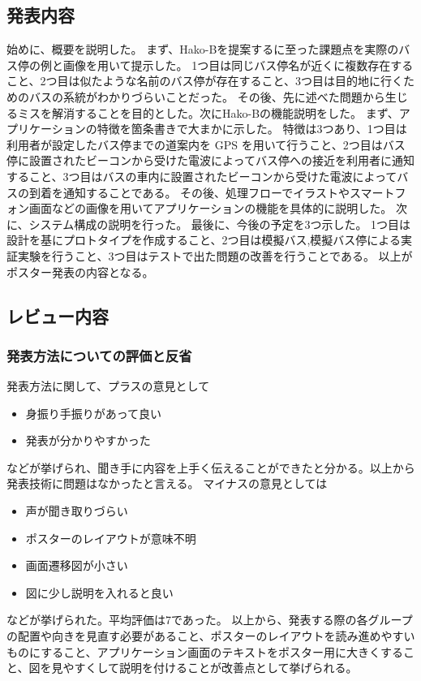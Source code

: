 \documentclass[openany,11pt,papersize]{jsbook}
\begin{document}

\subsection{発表内容}
始めに、概要を説明した。
まず、Hako-Bを提案するに至った課題点を実際のバス停の例と画像を用いて提示した。
1つ目は同じバス停名が近くに複数存在すること、2つ目は似たような名前のバス停が存在すること、3つ目は目的地に行くためのバスの系統がわかりづらいことだった。
その後、先に述べた問題から生じるミスを解消することを目的とした。次にHako-Bの機能説明をした。
まず、アプリケーションの特徴を箇条書きで大まかに示した。
特徴は3つあり、1つ目は利用者が設定したバス停までの道案内を GPS を用いて行うこと、2つ目はバス停に設置されたビーコンから受けた電波によってバス停への接近を利用者に通知すること、3つ目はバスの車内に設置されたビーコンから受けた電波によってバスの到着を通知することである。
その後、処理フローでイラストやスマートフォン画面などの画像を用いてアプリケーションの機能を具体的に説明した。
次に、システム構成の説明を行った。
最後に、今後の予定を3つ示した。
1つ目は設計を基にプロトタイプを作成すること、2つ目は模擬バス,模擬バス停による実証実験を行うこと、3つ目はテストで出た問題の改善を行うことである。
以上がポスター発表の内容となる。


\subsection{レビュー内容}

\subsubsection{発表方法についての評価と反省}
発表方法に関して、プラスの意見として
\begin{itemize}

\item 身振り手振りがあって良い
\item 発表が分かりやすかった

\end{itemize}
などが挙げられ、聞き手に内容を上手く伝えることができたと分かる。以上から発表技術に問題はなかったと言える。
マイナスの意見としては
\begin{itemize}

\item 声が聞き取りづらい
\item ポスターのレイアウトが意味不明
\item 画面遷移図が小さい
\item 図に少し説明を入れると良い

\end{itemize}
などが挙げられた。平均評価は7であった。
以上から、発表する際の各グループの配置や向きを見直す必要があること、ポスターのレイアウトを読み進めやすいものにすること、アプリケーション画面のテキストをポスター用に大きくすること、図を見やすくして説明を付けることが改善点として挙げられる。
\end{document}
